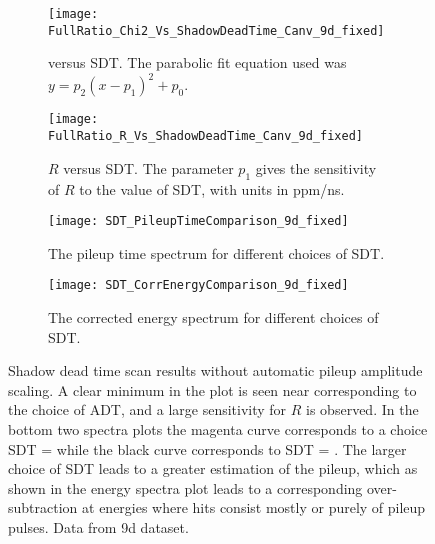 \begin{figure}[]
\centering
    \begin{subfigure}[t]{0.45\textwidth}
        \centering
        \texttt{[image: FullRatio\_Chi2\_Vs\_ShadowDeadTime\_Canv\_9d\_fixed]}
        \caption{\chisq versus SDT. The parabolic fit equation used was $y = p_{2}(x - p_{1})^{2} + p_{0}.$}
    \end{subfigure}%
    \hspace{1cm}
    \begin{subfigure}[t]{0.45\textwidth}
        \centering
        \texttt{[image: FullRatio\_R\_Vs\_ShadowDeadTime\_Canv\_9d\_fixed]}
        \caption{$R$ versus SDT. The parameter $p_{1}$ gives the sensitivity of $R$ to the value of SDT, with units in ppm/ns.}
    \end{subfigure}

    \begin{subfigure}[t]{0.45\textwidth}
        \centering
        \texttt{[image: SDT\_PileupTimeComparison\_9d\_fixed]}
        \caption{The pileup time spectrum for different choices of SDT.}
    \end{subfigure}%
    \hspace{1cm}
    \begin{subfigure}[t]{0.45\textwidth}
        \centering
        \texttt{[image: SDT\_CorrEnergyComparison\_9d\_fixed]}
        \caption{The corrected energy spectrum for different choices of SDT.}
    \end{subfigure}
\caption[Pileup shadow dead time scan without automatic pileup amplitude scaling]{Shadow dead time scan results without automatic pileup amplitude scaling. A clear minimum in the \chisq plot is seen near  corresponding to the choice of ADT, and a large sensitivity for $R$ is observed. In the bottom two spectra plots the magenta curve corresponds to a choice SDT =  while the black curve corresponds to SDT = . The larger choice of SDT leads to a greater estimation of the pileup, which as shown in the energy spectra plot leads to a corresponding over-subtraction at energies where hits consist mostly or purely of pileup pulses. Data from 9d dataset.}
\label{fig:SDTscan_noScaling}
\end{figure}


